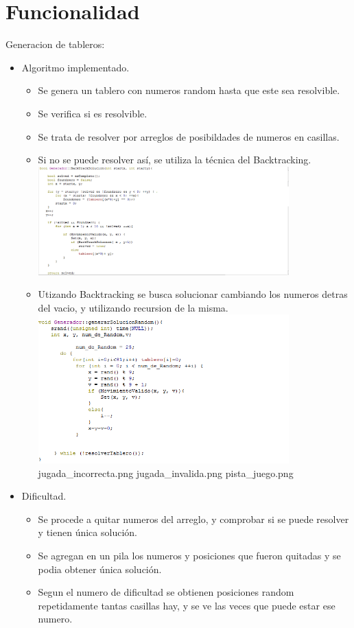 \documentclass[12pt,oneside]{book}
\begin{document}
\chapter{Funcionalidad}
\begin{center} Generacion de tableros:\end{center}
\begin{itemize}
\item  Algoritmo implementado.
\begin{itemize}
	\item Se genera un tablero con numeros random hasta que este sea resolvible.
	\item Se verifica si es resolvible.
	\item Se trata de resolver por arreglos de posibildades de numeros en casillas.
	\item Si no se puede resolver así, se utiliza la técnica del Backtracking. 
	\includegraphics[width=0.8\textwidth]{./imagenes/Codigo_backtrcking.png}
	\item Utizando Backtracking se busca solucionar cambiando los numeros detras del vacio, y utilizando recursion de la misma.
	\includegraphics[width=0.8\textwidth]{./imagenes/codigo_genrador.png}
	jugada_incorrecta.png
	jugada_invalida.png
	pista_juego.png
\end {itemize}

\item  Dificultad.
\begin {itemize}
	\item Se procede a quitar numeros del arreglo, y comprobar si se puede resolver y tienen única solución.
	\item Se agregan en un pila los numeros y posiciones que fueron quitadas y se podia obtener única solución.
	\item Segun el numero de dificultad se obtienen posiciones random repetidamente tantas casillas hay, y se ve las veces 
	que puede estar ese numero.



\end{itemize}
\end{itemize}
\end{document}

